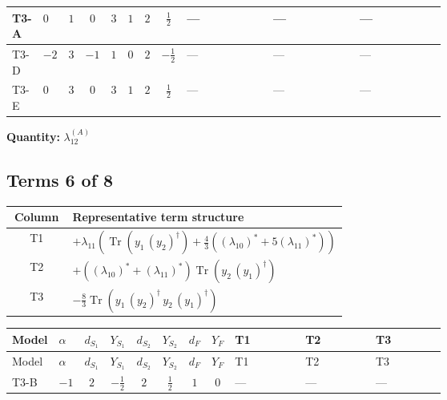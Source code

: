 \documentclass[8pt]{article}
\begin{document}
\begin{landscape}
\begin{longtable}{@{}llcccccc >{\raggedright\arraybackslash}p{0.21\linewidth} >{\raggedright\arraybackslash}p{0.21\linewidth} >{\raggedright\arraybackslash}p{0.21\linewidth}@{}}
\midrule
T3-A & $0$ & $1$ & $0$ & $3$ & $1$ & $2$ & $\frac{1}{2}$ & --- & --- & --- \\
\midrule
T3-D & $-2$ & $3$ & $-1$ & $1$ & $0$ & $2$ & $-\frac{1}{2}$ & --- & --- & --- \\
\midrule
T3-E & $0$ & $3$ & $0$ & $3$ & $1$ & $2$ & $\frac{1}{2}$ & --- & --- & --- \\
\midrule
\bottomrule
\end{longtable}
\clearpage
\noindent\textbf{Quantity: }$\lambda_{12}^{(A)}$\par\smallskip
\subsection*{Terms 6 of 8}
\begin{center}
\begin{tabular}{@{}c >{\raggedright\arraybackslash}p{0.82\linewidth}@{}}
\toprule
Column & Representative term structure \\
\midrule
T1 & \(\displaystyle +{\lambda_{11}} \left(\operatorname{Tr}\!\left({y_1}\,\left({y_2}\right)^{\dagger}\right)+\frac{4}{3} (\left({\lambda_{10}}\right)^{*}+5 \left({\lambda_{11}}\right)^{*})\right)\) \\
\midrule
T2 & \(\displaystyle +(\left({\lambda_{10}}\right)^{*}+\left({\lambda_{11}}\right)^{*}) \operatorname{Tr}\!\left({y_2}\,\left({y_1}\right)^{\dagger}\right)\) \\
\midrule
T3 & \(\displaystyle -\frac{8}{3} \operatorname{Tr}\!\left({y_1}\,\left({y_2}\right)^{\dagger}\,{y_2}\,\left({y_1}\right)^{\dagger}\right)\) \\
\midrule
\bottomrule
\end{tabular}
\end{center}
\smallskip
\tiny
\begin{longtable}{@{}llcccccc >{\raggedright\arraybackslash}p{0.21\linewidth} >{\raggedright\arraybackslash}p{0.21\linewidth} >{\raggedright\arraybackslash}p{0.21\linewidth}@{}}
\toprule
Model & $\alpha$ & $d_{S_1}$ & $Y_{S_1}$ & $d_{S_2}$ & $Y_{S_2}$ & $d_F$ & $Y_F$ & T1 & T2 & T3 \\
\midrule
\endfirsthead
\toprule
Model & $\alpha$ & $d_{S_1}$ & $Y_{S_1}$ & $d_{S_2}$ & $Y_{S_2}$ & $d_F$ & $Y_F$ & T1 & T2 & T3 \\
\midrule
\endhead
T3-B & $-1$ & $2$ & $-\frac{1}{2}$ & $2$ & $\frac{1}{2}$ & $1$ & $0$ & --- & --- & --- \\
\midrule

\end{longtable}
\end{landscape}
\end{document}
